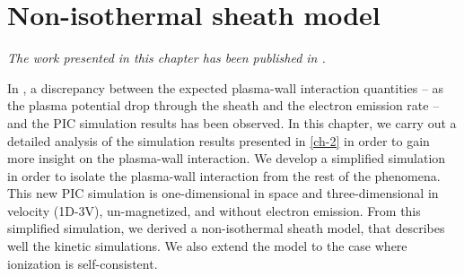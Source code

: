 



\chapter{Non-isothermal sheath model}
\label{ch-3}



\begin{Chabstract}
  
\emph{The work presented in this chapter has been published in  \citet{tavant2019}.}
\end{Chabstract}

\vspace{1ex}

\begin{Chabstract}
  
  In , a discrepancy between the expected plasma-wall interaction quantities -- as the plasma potential drop through the sheath and the electron emission rate -- and the \ac{PIC} simulation results has been observed.
  In this chapter, we carry out a detailed analysis of the simulation results presented in \cref{ch-2}  in order to gain more insight on the plasma-wall interaction.
  We develop a simplified simulation in order to isolate the plasma-wall interaction from the rest of the phenomena.
  This new \ac{PIC} simulation is one-dimensional in space and three-dimensional in velocity (\acs{1D}-\acs{3V}), un-magnetized, and without electron emission.
  From this simplified simulation, we derived a non-isothermal sheath model, that describes well the kinetic simulations.
  We also extend the model to the case where ionization is self-consistent.

\end{Chabstract}

\minitoc










